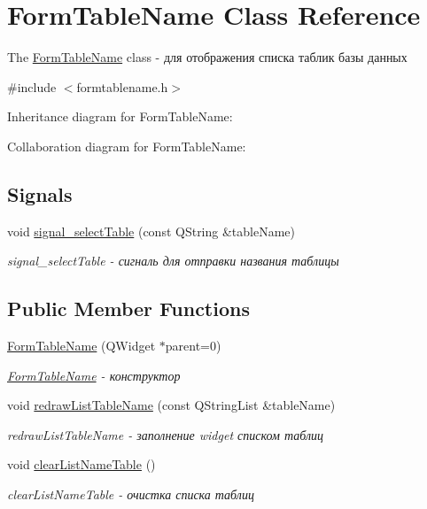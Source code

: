 \hypertarget{classFormTableName}{}\section{Form\+Table\+Name Class Reference}
\label{classFormTableName}


The \hyperlink{classFormTableName}{Form\+Table\+Name} class -\/ для отображения списка таблик базы данных  




{\ttfamily \#include $<$formtablename.\+h$>$}



Inheritance diagram for Form\+Table\+Name\+:


Collaboration diagram for Form\+Table\+Name\+:
\subsection*{Signals}
\begin{DoxyCompactItemize}
\item 
void \hyperlink{classFormTableName_ae48196d2f0cc732bbe463269884f841a}{signal\+\_\+select\+Table} (const Q\+String \&table\+Name)
\begin{DoxyCompactList}\small\item\em signal\+\_\+select\+Table -\/ сигналь для отправки названия таблицы \end{DoxyCompactList}\end{DoxyCompactItemize}
\subsection*{Public Member Functions}
\begin{DoxyCompactItemize}
\item 
\hyperlink{classFormTableName_afa68894f6031e57f82166a2941023331}{Form\+Table\+Name} (Q\+Widget $\ast$parent=0)
\begin{DoxyCompactList}\small\item\em \hyperlink{classFormTableName}{Form\+Table\+Name} -\/ конструктор \end{DoxyCompactList}\item 
void \hyperlink{classFormTableName_aa39e5e39a27e2c2e1d9bd0dba1d42a93}{redraw\+List\+Table\+Name} (const Q\+String\+List \&table\+Name)
\begin{DoxyCompactList}\small\item\em redraw\+List\+Table\+Name -\/ заполнение widget списком таблиц \end{DoxyCompactList}\item 
\mbox{\label{classFormTableName_ad12e214c7023b1bba6dd25a3e5b01b56}} 
void \hyperlink{classFormTableName_ad12e214c7023b1bba6dd25a3e5b01b56}{clear\+List\+Name\+Table} ()
\begin{DoxyCompactList}\small\item\em clear\+List\+Name\+Table -\/ очистка списка таблиц \end{DoxyCompactList}\end{DoxyCompactItemize}


